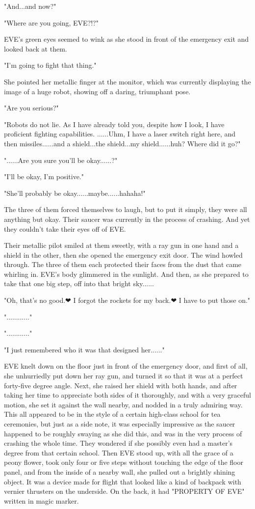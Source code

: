 \documentclass[
]{article}
\begin{document}
"And...and now?"

"Where are you going, EVE?!?"

EVE's green eyes seemed to wink as she stood in front of the emergency
exit and looked back at them.

"I'm going to fight that thing."

She pointed her metallic finger at the monitor, which was currently
displaying the image of a huge robot, showing off a daring, triumphant
pose.

"Are you serious?"

"Robots do not lie. As I have already told you, despite how I look, I
have proficient fighting capabilities. ......Uhm, I have a laser switch
right here, and then missiles......and a shield...the shield...my
shield......huh? Where did it go?"

"......Are you sure you'll be okay......?"

"I'll be okay, I'm positive."

"She'll probably be okay......maybe......hahaha!"

The three of them forced themselves to laugh, but to put it simply, they
were all anything but okay. Their saucer was currently in the process of
crashing. And yet they couldn't take their eyes off of EVE.

Their metallic pilot smiled at them sweetly, with a ray gun in one hand
and a shield in the other, then she opened the emergency exit door. The
wind howled through. The three of them each protected their faces from
the dust that came whirling in. EVE's body glimmered in the sunlight.
And then, as she prepared to take that one big step, off into that
bright sky......

"Oh, that's no good.❤ I forgot the rockets for my back.❤ I have to put
those on."

"............"

"............"

"I just remembered who it was that designed her......"

EVE knelt down on the floor just in front of the emergency door, and
first of all, she unhurriedly put down her ray gun, and turned it so
that it was at a perfect forty-five degree angle. Next, she raised her
shield with both hands, and after taking her time to appreciate both
sides of it thoroughly, and with a very graceful motion, she set it
against the wall nearby, and nodded in a truly admiring way. This all
appeared to be in the style of a certain high-class school for tea
ceremonies, but just as a side note, it was especially impressive as the
saucer happened to be roughly swaying as she did this, and was in the
very process of crashing the whole time. They wondered if she possibly
even had a master's degree from that certain school. Then EVE stood up,
with all the grace of a peony flower, took only four or five steps
without touching the edge of the floor panel, and from the inside of a
nearby wall, she pulled out a brightly shining object. It was a device
made for flight that looked like a kind of backpack with vernier
thrusters on the underside. On the back, it had "PROPERTY OF EVE"
written in magic marker.
\end{document}
